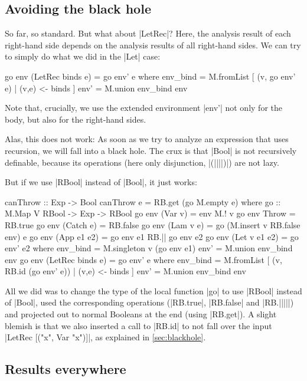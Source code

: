 \documentclass[manuscript,anonymous,screen,acmsmall]{acmart}
\begin{document}
\subsection{Avoiding the black hole}
So far, so standard. But what about |LetRec|? Here, the analysis result of each right-hand side depends on the analysis results of all right-hand sides. We can try to simply do what we did in the |Let| case:
\restorecolumns
\begin{code}
    go env (LetRec binds e) = go env' e
      where
        env_bind  = M.fromList [ (v, go env' e) | (v,e) <- binds ]
        env'      = M.union env_bind env
\end{code}
Note that, crucially, we use the extended environment |env'| not only for the body, but also for the right-hand sides.

Alas, this does not work: As soon as we try to analyze an expression that uses recursion, we will fall into a black hole. The crux is that |Bool| is not recursively definable, because its operations (here only disjunction, |(||||)|) are not lazy.

But if we use |RBool| instead of |Bool|, it just works:
\restorecolumns
\begin{code}
canThrow :: Exp -> Bool
canThrow e = RB.get (go M.empty e)
  where
    go :: M.Map V RBool -> Exp -> RBool
    go env (Var v)          = env M.! v
    go env Throw            = RB.true
    go env (Catch e)        = RB.false
    go env (Lam v e)        = go (M.insert v RB.false env) e
    go env (App e1 e2)      = go env e1 RB.|| go env e2
    go env (Let v e1 e2)    = go env' e2
      where
        env_bind  = M.singleton v (go env e1)
        env'      = M.union env_bind env
    go env (LetRec binds e) = go env' e
      where
        env_bind  = M.fromList [ (v, RB.id (go env' e)) | (v,e) <- binds ]
        env'      = M.union env_bind env
\end{code}
All we did was to change the type of the local function |go| to use |RBool| instead of |Bool|, used the corresponding operations (|RB.true|, |RB.false| and |RB.|||||) and  projected out to normal Booleans at the end (using |RB.get|). A slight blemish is that we also inserted a call to |RB.id| to not fall over the input |LetRec [("x", Var "x")]|, as explained in \cref{sec:blackhole}.

\subsection{Results everywhere}
\end{document}

